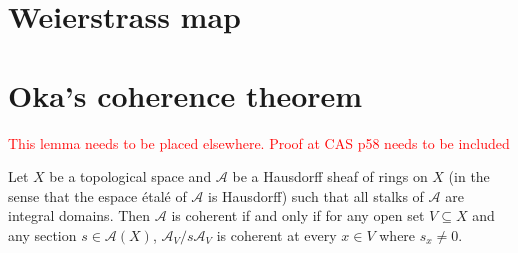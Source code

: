 \section{Weierstrass map}

\section{Oka's coherence theorem}

\textcolor{red}{This lemma needs to be placed elsewhere. Proof at CAS p58 needs to be included}
\begin{lemma}\label{lma-formalcoherencecriterion}
    Let $X$ be a topological space and $\mathcal{A}$ be a Hausdorff sheaf of rings on $X$ (in the sense that the espace étalé of $\mathcal{A}$ is Hausdorff) such that all stalks of $\mathcal{A}$ are integral domains. Then $\mathcal{A}$ is coherent if and only if for any open set $V\subseteq X$ and any section $s\in \mathcal{A}(X)$, $\mathcal{A}_V/s\mathcal{A}_V$ is coherent at every $x\in V$ where $s_x\neq 0$.
\end{lemma}

